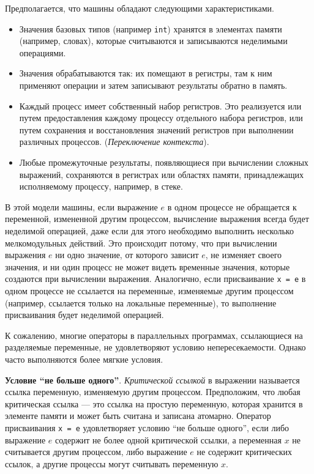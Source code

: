 Предполагается, что машины обладают следующими характеристиками.
\begin{itemize}
  \item Значения базовых типов (например \texttt{int}) хранятся в элементах
    памяти (например, словах), которые считываются и записываются неделимыми
    операциями.
  \item Значения обрабатываются так: их помещают в регистры, там к ним применяют
    операции и затем записывают результаты обратно в память.
  \item Каждый процесс имеет собственный набор регистров. Это реализуется или
    путем предоставления каждому процессу отдельного набора регистров, или путем
    сохранения и восстановления значений регистров при выполнении различных
    процессов. (\emph{Переключение контекста}).
  \item Любые промежуточные результаты, появляющиеся при вычислении сложных
    выражений, сохраняются в регистрах или областях памяти, принадлежащих
    исполняемому процессу, например, в стеке.
\end{itemize}

В этой модели машины, если выражение $e$ в одном процессе не обращается к
переменной, измененной другим процессом, вычисление выражения всегда будет
неделимой операцией, даже если для этого необходимо выполнить несколько
мелкомодульных действий. Это происходит потому, что при вычислении выражения $e$
ни одно значение, от которого зависит $e$, не изменяет своего значения, и ни
один процесс не может видеть временные значения, которые создаются при
вычислении выражения. Аналогично, если присваивание \texttt{x = e} в одном
процессе не ссылается на переменные, изменяемые другим процессом (например,
ссылается только на локальные переменные), то выполнение присваивания будет
неделимой операцией.

К сожалению, многие операторы в параллельных программах, ссылающиеся на
разделяемые переменные, не удовлетворяют условию непересекаемости. Однако часто
выполняются более мягкие условия.

\textbf{Условие ``не больше одного''}. \emph{Критической ссылкой} в выражении
называется ссылка переменную, изменяемую другим процессом. Предположим, что
любая критическая ссылка --- это ссылка на простую переменную, которая хранится
в элементе памяти и может быть считана и записана атомарно. Оператор
присваивания \texttt{x = e} удовлетворяет условию ``не больше одного'', если
либо выражение $e$ содержит не более одной критической ссылки, а переменная $x$
не считывается другим процессом, либо выражение $e$ не содержит критических
ссылок, а другие процессы могут считывать переменную $x$.

